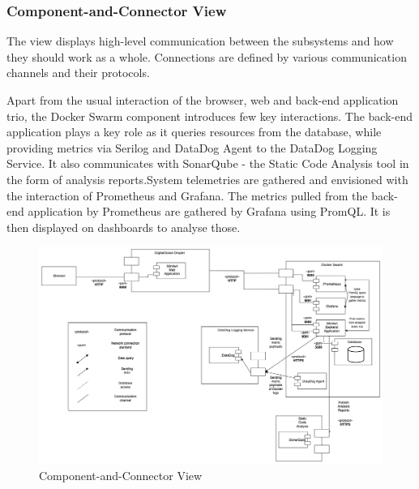 \newpage
\subsubsection*{Component-and-Connector View}

The view displays high-level communication between the subsystems and how they should work as a whole. Connections are defined by various communication channels and their protocols.
\vspace{3mm}

Apart from the usual interaction of the browser, web and back-end application trio, the Docker Swarm component introduces few key interactions. The back-end application plays a key role as it queries resources from the database, while providing metrics via Serilog and DataDog Agent to the DataDog Logging Service. It also communicates with SonarQube - the Static Code Analysis tool in the form of analysis reports.System telemetries are gathered and envisioned with the interaction of Prometheus and Grafana. The metrics pulled from the back-end application by Prometheus are gathered by Grafana using PromQL. It is then displayed on dashboards to analyse those.
\vspace{3mm}

\begin{figure}[h!]
    \centering
    \includegraphics[width=\linewidth,height=\textheight,keepaspectratio]{images/architectural_views/minitwit_cc_view.png}
    \caption{Component-and-Connector View ~\cite{componentAndConnectorView}}
    \label{fig:ccview}
\end{figure}